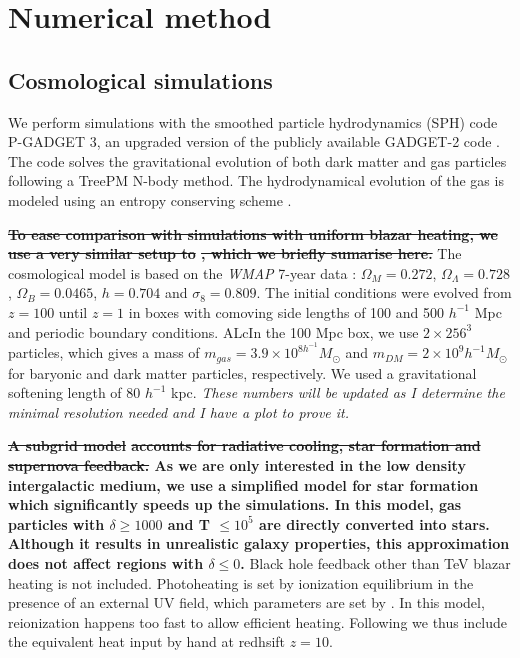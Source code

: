 \documentclass[twocolumns]{emulateapj}
\newcommand\ALc[1]{{\color{red} \bf #1}} %
\begin{document}


 


\section{Numerical method}
\subsection{Cosmological simulations}
We perform simulations with the smoothed particle hydrodynamics (SPH)  code \textsc{P-GADGET 3}, an upgraded version of the publicly available \textsc{GADGET-2} code \citep{2005MNRAS.364.1105S}. The code solves the gravitational evolution of both dark matter and gas particles following a TreePM N-body method. The hydrodynamical evolution of the gas is modeled using an entropy conserving scheme \citep{2002MNRAS.333..649S}.

\ALc{\sout{To ease comparison with simulations with uniform blazar heating, we use a very similar setup to }\citet{2012MNRAS.423..149P}\sout{, which we briefly sumarise here. }}
The cosmological model is based on the \textit{WMAP} 7-year data \citep{2011ApJS..192...18K}: $\Omega_M=0.272$, $\Omega_{\Lambda}=0.728$, $\Omega_{B}= 0.0465$, $h=0.704$ and $\sigma_8=0.809$. The initial conditions were evolved from $z=100$ until $z=1$ in boxes with  comoving side lengths of 100 and 500 $h^{-1}$ Mpc and periodic boundary conditions. ALc{In the 100 Mpc box, we use $2\times 256^3$ particles, which gives a mass of $m_{gas}=3.9\times10^{8 h^{-1} }M_{\odot}$ and $m_{DM}=2\times 10^{9} h^{-1} M_{\odot}$ for baryonic and dark matter particles, respectively. We used  a gravitational softening length of 80 $h^{-1}$ kpc. \textit{These numbers will be updated as I determine the minimal resolution needed and I have a plot to prove it.}}

\ALc{\sout{A subgrid model} \citep{2003MNRAS.339..289S} \sout{accounts for radiative cooling, star formation and supernova feedback.} As we are only interested in the low density intergalactic medium, we use a simplified model for star formation which significantly speeds up the simulations. In this model, gas particles with $\delta\geq 1000$ and T $\leq 10^5$ are directly converted into stars. Although it results in unrealistic galaxy properties, this approximation does not affect regions with $\delta \leq 0$.}  Black hole feedback other than TeV blazar heating is not included. Photoheating is set by ionization equilibrium in the presence of an external UV field, which parameters are set by \citet{2009ApJ...703.1416F}. In this model, reionization happens too fast to allow efficient heating. Following \citet{2012MNRAS.423..149P} we thus include the equivalent heat input by hand at redhsift $z=10$.
\end{document}
